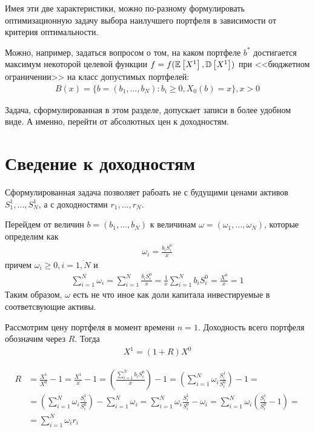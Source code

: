 Имея эти две характеристики, можно по-разному формулировать оптимизационную задачу выбора наилучшего портфеля в
зависимости от критерия оптимальности.

Можно, например, задаться вопросом о том, на каком портфеле $b^*$ достигается максимум некоторой целевой функции 
$f = f(\mathbb{E}\left[X^1\right], \mathbb{D}\left[X^1\right])$ при <<бюджетном ограничении>> на класс допустимых портфелей:
\begin{align}
	B(x) = \{b=(b_1, \dots, b_N): b_i \ge 0, X_0(b) = x\}, x > 0
\end{align}

Задача, сформулированная в этом разделе, допускает записи в более удобном виде. А именно, перейти от абсолютных цен
к доходностям.

\section{Сведение к доходностям}

Сформулированная задача позволяет рабоать не с будущими ценами активов $S_1^1, \dots, S_N^1$,
а с доходностями $r_1, \dots, r_N$.

Перейдем от величин $b = (b_1, \dots, b_N)$ к величинам $\omega = (\omega_1, \dots, \omega_N)$, которые определим как
\begin{align}
	\omega_i = \frac{b_i S_i^0}{x}
\end{align}
причем $\omega_i \ge 0, i=\overline{1, N}$ и
\begin{align}
	\sum_{i=1}^{N} \omega_i 
	= \sum_{i=1}^{N} \frac{b_i S_i^0}{x}
	= \frac{1}{x} \sum_{i=1}^{N} b_i S_i^0
	= \frac{X^0}{x} = 1
\end{align}
Таким образом, $\omega$ есть не что иное как доли капитала инвестируемые в соответсвующие активы.

Рассмотрим цену портфеля в момент времени $n=1$. Доходность всего портфеля обозначим через $R$. Тогда
\begin{align}
	X^1 = (1 + R) X^0
\end{align}

\begin{align}
	R &= \frac{X^1}{X^0} - 1 
	= \frac{X^1}{x} - 1 
	= \left(\frac{\sum_{i=1}^{N}b_i S_i^0}{x}\right) - 1 
	= \left(\sum_{i=1}^{N} \omega_i \frac{S_i^1}{S_i^0}\right) - 1 = \\
	&= \left(\sum_{i=1}^{N} \omega_i \frac{S_i^1}{S_i^0}\right) - \sum_{i=1}^{N} \omega_i
	= \sum_{i=1}^{N} \omega_i \frac{S_i^1}{S_i^0} - \omega_i 
	= \sum_{i=1}^{N} \omega_i \left(\frac{S_i^1}{S_i^0} - 1\right) = \\
	&= \sum_{i=1}^{N} \omega_i r_i
\end{align}

